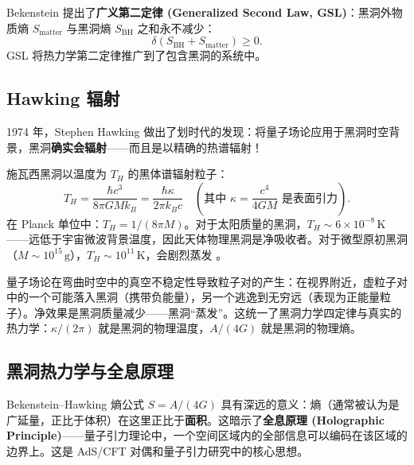 \begin{note}[广义第二定律]
Bekenstein 提出了\textbf{广义第二定律 (Generalized Second Law, GSL)}：黑洞外物质熵 $S_{\text{matter}}$ 与黑洞熵 $S_{\text{BH}}$ 之和永不减少：
\begin{equation}
    \delta(S_{\text{BH}} + S_{\text{matter}}) \geq 0.
\end{equation}
GSL 将热力学第二定律推广到了包含黑洞的系统中。
\end{note}

\subsection{Hawking 辐射}

1974 年，Stephen Hawking 做出了划时代的发现：将量子场论应用于黑洞时空背景，黑洞\textbf{确实会辐射}——而且是以精确的热谱辐射！

\begin{theorem}
施瓦西黑洞以温度为 $T_H$ 的黑体谱辐射粒子：
\begin{equation}
    \boxed{T_H = \frac{\hbar c^3}{8\pi G M k_B} = \frac{\hbar \kappa}{2\pi k_B c} \quad (\text{其中 } \kappa = \frac{c^4}{4GM} \text{ 是表面引力})}.
    \label{eq:Hawking_temp}
\end{equation}
在 Planck 单位中：$T_H = 1/(8\pi M)$。对于太阳质量的黑洞，$T_H \sim 6\times10^{-8}\,\text{K}$——远低于宇宙微波背景温度，因此天体物理黑洞是净吸收者。对于微型原初黑洞（$M \sim 10^{15}\,\text{g}$），$T_H \sim 10^{11}\,\text{K}$，会剧烈蒸发 \cite{Hawking1974}。
\end{theorem}

\begin{note}
量子场论在弯曲时空中的真空不稳定性导致粒子对的产生：在视界附近，虚粒子对中的一个可能落入黑洞（携带负能量），另一个逃逸到无穷远（表现为正能量粒子）。净效果是黑洞质量减少——黑洞“蒸发”。这统一了黑洞力学四定律与真实的热力学：$\kappa/(2\pi)$ 就是黑洞的物理温度，$A/(4G)$ 就是黑洞的物理熵。
\end{note}

\subsection{黑洞热力学与全息原理}

Bekenstein–Hawking 熵公式 $S = A/(4G)$ 具有深远的意义：熵（通常被认为是广延量，正比于体积）在这里正比于\textbf{面积}。这暗示了\textbf{全息原理 (Holographic Principle)}——量子引力理论中，一个空间区域内的全部信息可以编码在该区域的边界上。这是 AdS/CFT 对偶和量子引力研究中的核心思想。

